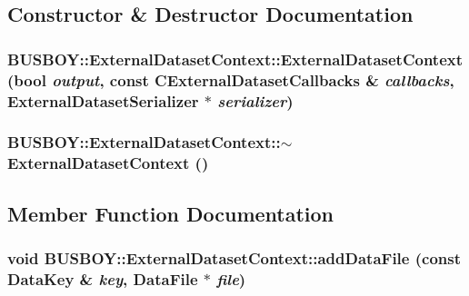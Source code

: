 \subsection{Constructor \& Destructor Documentation}
\hypertarget{classBUSBOY_1_1ExternalDatasetContext_a1f74c2b15f7b803acafbf7d1e956bb9e}{
\subsubsection[{ExternalDatasetContext}]{\setlength{\rightskip}{0pt plus 5cm}BUSBOY::ExternalDatasetContext::ExternalDatasetContext (bool {\em output}, \/  const {\bf CExternalDatasetCallbacks} \& {\em callbacks}, \/  {\bf ExternalDatasetSerializer} $\ast$ {\em serializer})}}
\label{classBUSBOY_1_1ExternalDatasetContext_a1f74c2b15f7b803acafbf7d1e956bb9e}
\hypertarget{classBUSBOY_1_1ExternalDatasetContext_a2b884634c3d7d068635bf627badd39f7}{
\subsubsection[{$\sim$ExternalDatasetContext}]{\setlength{\rightskip}{0pt plus 5cm}BUSBOY::ExternalDatasetContext::$\sim$ExternalDatasetContext ()}}
\label{classBUSBOY_1_1ExternalDatasetContext_a2b884634c3d7d068635bf627badd39f7}


\subsection{Member Function Documentation}
\hypertarget{classBUSBOY_1_1ExternalDatasetContext_a26b99881ddf50b9956773a0ff390dd7b}{
\subsubsection[{addDataFile}]{\setlength{\rightskip}{0pt plus 5cm}void BUSBOY::ExternalDatasetContext::addDataFile (const {\bf DataKey} \& {\em key}, \/  {\bf DataFile} $\ast$ {\em file})}}
\label{classBUSBOY_1_1ExternalDatasetContext_a26b99881ddf50b9956773a0ff390dd7b}


